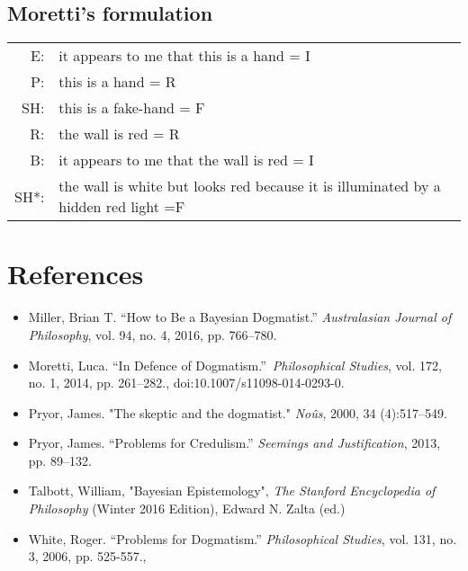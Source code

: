 \subsection*{\normalsize Moretti's formulation}
\begin{tabular}{rp{8cm}}
	E: 	& it appears to me that this is a hand = I \\

	P: 	& this is a hand = R\\

	SH: 	& this is a fake-hand = F \\

	R: 	& the wall is red = R\\
	B: 	& it appears to me that the wall is red = I\\
	SH*: & the wall is white but looks red because it is illuminated by a
hidden red light =F
\end{tabular}
\clearpage
\section*{References}
{
\small
\begin{itemize}[label={},itemindent=-2em,leftmargin=2em]	
	\item Miller, Brian T. ``How to Be a Bayesian Dogmatist.'' \emph{Australasian
Journal of Philosophy}, vol. 94, no. 4, 2016, pp. 766--780.

	\item Moretti, Luca. ``In Defence of Dogmatism.''~\emph{Philosophical
Studies}, vol. 172, no. 1, 2014, pp. 261--282.,
doi:10.1007/s11098-014-0293-0.

	\item Pryor, James. "The skeptic and the dogmatist." \emph{Noûs}, 2000, 34
(4):517--549.

	\item Pryor, James. ``Problems for Credulism.'' \emph{Seemings and
Justification}, 2013, pp. 89--132.

	\item Talbott, William, "Bayesian Epistemology", \emph{The Stanford
Encyclopedia of Philosophy} (Winter 2016 Edition), Edward N.
Zalta (ed.)

	\item White, Roger. ``Problems for Dogmatism.'' \emph{Philosophical Studies},
vol. 131, no. 3, 2006, pp. 525-557., 
\end{itemize}
}